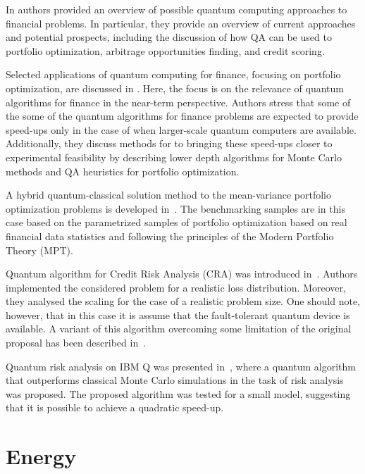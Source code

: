 \documentclass[a4paper,11pt]{article}
\begin{document}
In \cite{orus2019quantum} authors provided an overview of possible quantum computing approaches to financial problems. In particular, they provide an overview of current approaches and potential prospects, including the discussion of how QA can be used to portfolio optimization, arbitrage opportunities finding, and credit scoring.

Selected applications of quantum computing for finance, focusing on portfolio optimization, are discussed in \cite{bouland2020prospects}. Here, the focus is on  the relevance of quantum algorithms for finance in the near-term perspective. Authors stress that some of the some of the quantum algorithms for finance problems are expected to provide speed-ups only in the case of when larger-scale quantum computers are available. Additionally, they discuss methods for to bringing these speed-ups closer to experimental feasibility by describing lower depth algorithms for Monte Carlo methods and QA heuristics for portfolio optimization.

A hybrid quantum-classical solution method to the mean-variance portfolio optimization problems is developed in~\cite{venturelli2019reverse}. The benchmarking samples are in this case based on the parametrized samples of portfolio optimization based on real financial data statistics and following the principles of the Modern Portfolio Theory (MPT).


Quantum algorithm for Credit Risk Analysis (CRA) was introduced in~\cite{egger2021credit}. Authors implemented the considered problem for a realistic loss distribution. Moreover, they analysed the scaling  for the case of a realistic problem size. One should note, however, that in this case it is assume that the fault-tolerant quantum device is available. A variant of this algorithm overcoming some limitation of the original proposal has been described in~\cite{dri2022towards,dri2023more}.


Quantum risk analysis on IBM Q was presented in~\cite{woerner2019quantum}, where a quantum algorithm that outperforms classical Monte Carlo simulations in the task of risk analysis was proposed.  The proposed algorithm was
tested for a small model, suggesting that it is possible to achieve a quadratic speed-up.

\newpage 

\section{Energy}
\end{document}

